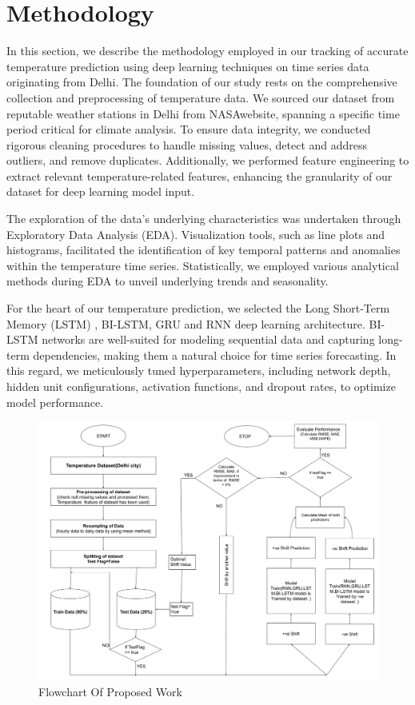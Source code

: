 \documentclass[sn-mathphys,Numbered]{sn-jnl}
\theoremstyle{thmstyleone}
\theoremstyle{thmstyletwo}
\theoremstyle{thmstylethree}
\begin{document}
\section{Methodology}
In this section, we describe the methodology employed in our tracking of accurate temperature prediction using deep learning techniques on time series data originating from Delhi. The foundation of our study rests on the comprehensive collection and preprocessing of temperature data. We sourced our dataset from reputable weather stations in Delhi from NASAwebsite, spanning a specific time period critical for climate analysis. To ensure data integrity, we conducted rigorous cleaning procedures to handle missing values, detect and address outliers, and remove duplicates. Additionally, we performed feature engineering to extract relevant temperature-related features, enhancing the granularity of our dataset for deep learning model input.

The exploration of the data's underlying characteristics was undertaken through Exploratory Data Analysis (EDA). Visualization tools, such as line plots and histograms, facilitated the identification of key temporal patterns and anomalies within the temperature time series. Statistically, we employed various analytical methods during EDA to unveil underlying trends and seasonality.

For the heart of our temperature prediction, we selected the Long Short-Term Memory (LSTM) , BI-LSTM, GRU and RNN deep learning architecture. BI-LSTM networks are well-suited for modeling sequential data and capturing long-term dependencies, making them a natural choice for time series forecasting. In this regard, we meticulously tuned hyperparameters, including network depth, hidden unit configurations, activation functions, and dropout rates, to optimize model performance.



\begin{figure}[ht!]
    \centering
    \includegraphics[width=1\textwidth, height=0.9\linewidth]{FlowchartOfjournal.png}
    \caption{Flowchart Of Proposed Work}
    \label{fig:Flowchart Of Proposed Work}
\end{figure}
\end{document}
